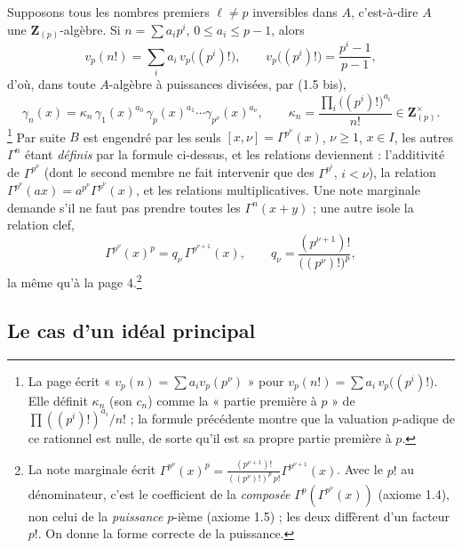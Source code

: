 \documentclass[11pt,a4paper]{article}
\begin{document}
Supposons tous les nombres premiers $\ell \neq p$ inversibles dans $A$,
c'est-à-dire $A$ une $\mathbf{Z}_{(p)}$-algèbre. Si $n = \sum a_i p^{i}$,
$0 \leqslant a_i \leqslant p-1$, alors
\[
v_p(n!) = \sum_i a_i\, v_p\bigl((p^{i})!\bigr), \qquad v_p\bigl((p^{i})!\bigr)
= \frac{p^{i}-1}{p-1},
\]
d'où, dans toute $A$-algèbre à puissances divisées, par (1.5 bis),
\[
\gamma_n(x) = \kappa_n\, \gamma_1(x)^{a_0}\,\gamma_p(x)^{a_1}\cdots
\gamma_{p^{\nu}}(x)^{a_\nu}, \qquad \kappa_n = \frac{\prod_i
\bigl((p^{i})!\bigr)^{a_i}}{n!} \in \mathbf{Z}_{(p)}^{\times}.
\]
\footnote{La page écrit « $v_p(n) = \sum a_i v_p(p^{\nu})$ » pour
$v_p(n!) = \sum a_i\, v_p\bigl((p^{i})!\bigr)$. Elle définit $\kappa_n$ (son
$c_n$) comme la « partie première à $p$ » de $\prod((p^{i})!)^{a_i}/n!$ ; la
formule précédente montre que la valuation $p$-adique de ce rationnel est
nulle, de sorte qu'il est sa propre partie première à $p$.} Par suite $B$ est
engendré par les seuls $[x, \nu] = \Gamma^{p^{\nu}}(x)$, $\nu \geqslant 1$,
$x \in I$, les autres $\Gamma^{n}$ étant \emph{définis} par la formule
ci-dessus, et les relations deviennent : l'additivité de $\Gamma^{p^{\nu}}$
(dont le second membre ne fait intervenir que des $\Gamma^{p^{i}}$, $i <
\nu$), la relation $\Gamma^{p^{\nu}}(ax) = a^{p^{\nu}}\Gamma^{p^{\nu}}(x)$, et
les relations multiplicatives. Une note marginale demande s'il ne faut pas
prendre toutes les $\Gamma^{n}(x+y)$ ; une autre isole la relation clef,
\[
\Gamma^{p^{\nu}}(x)^{p} = q_\nu\, \Gamma^{p^{\nu+1}}(x), \qquad
q_\nu = \frac{(p^{\nu+1})!}{\bigl((p^{\nu})!\bigr)^{p}} ,
\]
la même qu'à la page 4.\footnote{La note marginale écrit
$\Gamma^{p^{\nu}}(x)^{p} = \frac{(p^{\nu+1})!}{((p^{\nu})!)^{p}\, p!}
\Gamma^{p^{\nu+1}}(x)$. Avec le $p!$ au dénominateur, c'est le coefficient de
la \emph{composée} $\Gamma^{p}(\Gamma^{p^{\nu}}(x))$ (axiome 1.4), non celui
de la \emph{puissance} $p$-ième (axiome 1.5) ; les deux diffèrent d'un
facteur $p!$. On donne la forme correcte de la puissance.}

\subsection*{Le cas d'un idéal principal}
\end{document}
